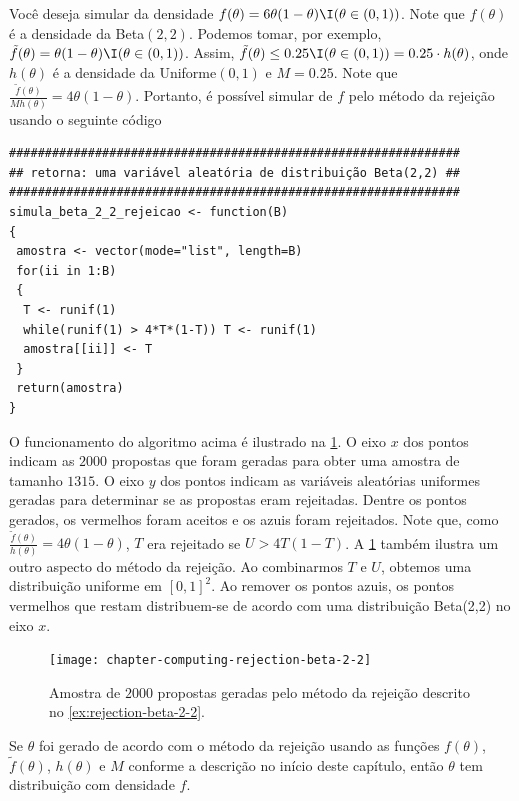 \begin{example}
 \label{ex:rejection-beta-2-2}
 Você deseja simular da densidade
 $f(\theta) = 6\theta(1-\theta)\I(\theta \in (0,1))$.
 Note que $f(\theta)$ é a densidade da Beta$(2,2)$.
 Podemos tomar, por exemplo,
 $\tilde{f}(\theta) = \theta(1-\theta) \I(\theta \in (0,1))$.
 Assim, $\tilde{f}(\theta) \leq 0.25 \I(\theta \in (0,1)) = 0.25 \cdot h(\theta)$,
 onde $h(\theta)$ é a densidade da
 Uniforme$(0,1)$ e $M=0.25$.
 Note que $\frac{\tilde{f}(\theta)}{M h(\theta)} = 4\theta(1-\theta)$.
 Portanto, é possível simular de $f$ pelo
 método da rejeição 
 usando o seguinte código
 \begin{verbatim}
###############################################################
## retorna: uma variável aleatória de distribuição Beta(2,2) ##
###############################################################
simula_beta_2_2_rejeicao <- function(B)
{
 amostra <- vector(mode="list", length=B)
 for(ii in 1:B)
 {
  T <- runif(1)
  while(runif(1) > 4*T*(1-T)) T <- runif(1)
  amostra[[ii]] <- T
 }
 return(amostra)
}
\end{verbatim}

 O funcionamento do algoritmo acima é ilustrado na
 \cref{fig:rejection-beta-2-2}.
 O eixo $x$ dos pontos indicam as $2000$ propostas que
 foram geradas para obter uma amostra de tamanho $1315$.
 O eixo $y$ dos pontos indicam as
 variáveis aleatórias uniformes geradas para
 determinar se as propostas eram rejeitadas.
 Dentre os pontos gerados, os vermelhos foram aceitos e
 os azuis foram rejeitados.
 Note que, como $\frac{\tilde{f}(\theta)}{h(\theta)} = 4\theta(1-\theta)$,
 $T$ era rejeitado se $U > 4T(1-T)$.
 A \cref{fig:rejection-beta-2-2} também ilustra um
 outro aspecto do método da rejeição.
 Ao combinarmos $T$ e $U$, obtemos uma
 distribuição uniforme em $[0,1]^{2}$.
 Ao remover os pontos azuis,
 os pontos vermelhos que restam distribuem-se de
 acordo com uma distribuição Beta(2,2) no eixo $x$.
 \begin{figure}
  \centering
  \texttt{[image: chapter-computing-rejection-beta-2-2]}
  \caption{Amostra de $2000$ propostas geradas pelo
  método da rejeição descrito no
  \cref{ex:rejection-beta-2-2}.}
  \label{fig:rejection-beta-2-2}
 \end{figure}
\end{example}

\begin{theorem}
 Se $\theta$ foi gerado de acordo com o
 método da rejeição usando as funções $f(\theta)$,
 $\tilde{f}(\theta)$, $h(\theta)$ e $M$
 conforme a descrição no início deste capítulo,
 então $\theta$ tem distribuição com densidade $f$.
\end{theorem}

